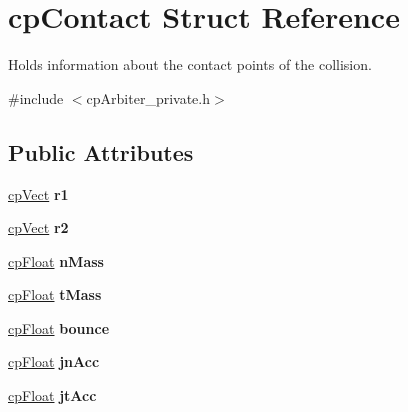 \hypertarget{structcp_contact}{}\section{cp\+Contact Struct Reference}
\label{structcp_contact}


Holds information about the contact points of the collision.  




{\ttfamily \#include $<$cp\+Arbiter\+\_\+private.\+h$>$}

\subsection*{Public Attributes}
\begin{DoxyCompactItemize}
\item 
\hypertarget{structcp_contact_a30ea3ddb5c7b028cd1ce5d2ee92ac301}{}\hyperlink{structcp_vect}{cp\+Vect} {\bfseries r1}\label{structcp_contact_a30ea3ddb5c7b028cd1ce5d2ee92ac301}

\item 
\hypertarget{structcp_contact_a07adb5206473f2fc05b4344abde787cd}{}\hyperlink{structcp_vect}{cp\+Vect} {\bfseries r2}\label{structcp_contact_a07adb5206473f2fc05b4344abde787cd}

\item 
\hypertarget{structcp_contact_ac5d0505328b0068f47eee7927268f69e}{}\hyperlink{group__basic_types_gac1ed65573e035bf892505768c852d8d3}{cp\+Float} {\bfseries n\+Mass}\label{structcp_contact_ac5d0505328b0068f47eee7927268f69e}

\item 
\hypertarget{structcp_contact_a0ad3ef72cf8b1063953c8539a24a0559}{}\hyperlink{group__basic_types_gac1ed65573e035bf892505768c852d8d3}{cp\+Float} {\bfseries t\+Mass}\label{structcp_contact_a0ad3ef72cf8b1063953c8539a24a0559}

\item 
\hypertarget{structcp_contact_a2d3afaf4917fc1f240b145ba4792a65d}{}\hyperlink{group__basic_types_gac1ed65573e035bf892505768c852d8d3}{cp\+Float} {\bfseries bounce}\label{structcp_contact_a2d3afaf4917fc1f240b145ba4792a65d}

\item 
\hypertarget{structcp_contact_ab6e608723226293fed10834a1e79215c}{}\hyperlink{group__basic_types_gac1ed65573e035bf892505768c852d8d3}{cp\+Float} {\bfseries jn\+Acc}\label{structcp_contact_ab6e608723226293fed10834a1e79215c}

\item 
\hypertarget{structcp_contact_a45337f7a21dc55faf402f87465d7bd5c}{}\hyperlink{group__basic_types_gac1ed65573e035bf892505768c852d8d3}{cp\+Float} {\bfseries jt\+Acc}\label{structcp_contact_a45337f7a21dc55faf402f87465d7bd5c}


\end{DoxyCompactItemize}
